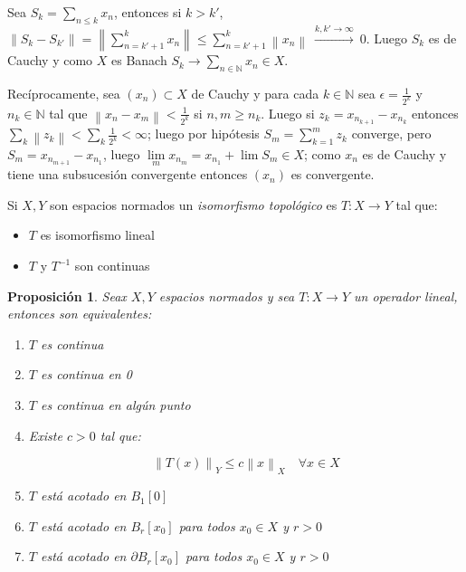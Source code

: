 \documentclass[11pt]{article}
\newcommand{\N}{{\mathbb{N}}}
\newcommand{\norm}[1]{\left\lVert#1\right\rVert}
\newcommand{\Bigsum}[2]{\sum\limits_{#1}{#2}}
\numberwithin{theorem}{subsection}
\newtheorem{proposition}[theorem]{Proposici\'on}
\newenvironment{proof}[1][Demostraci\'on]{\begin{trivlist}
		\item[\hskip \labelsep {\bfseries #1}]}{\end{trivlist}}
\newenvironment{definition}[1][Definici\'on]{\begin{trivlist}
		\item[\hskip \labelsep {\bfseries #1}]}{\end{trivlist}}
\newcommand{\qed}{\nobreak \ifvmode \relax \else
	\ifdim\lastskip<1.5em \hskip-\lastskip
	\hskip1.5em plus0em minus0.5em \fi \nobreak
	\vrule height0.75em width0.5em depth0.25em\fi}
\begin{document}
\begin{proof}
	Sea $S_k = \Bigsum{n \leq k}{x_n}$, entonces si $k > k'$, $\norm{S_{k} - S_{k'}} = \norm{\sum\limits_{n = k'+1}^{k}{x_n}} \leq \sum\limits_{n = k'+1}^{k}{\norm{x_n}} \ \xrightarrow{k,k' \rightarrow \infty} \ 0$. Luego $S_k$ es de Cauchy y como $X$ es Banach $S_k \rightarrow \Bigsum{n \in \N}{x_n} \in X$.
	
	Rec\'iprocamente, sea $\left(x_n\right) \subset X$ de Cauchy y para cada $k \in \N$ sea $\epsilon = \frac{1}{2^k}$ y $n_k \in \N$ tal que $\norm{x_{n} - x_m} < \frac{1}{2^k}$ si $n,m \geq n_k$. Luego si $z_k = x_{n_{k+1}} - x_{n_k}$ entonces $\Bigsum{k}{\norm{z_k}} < \Bigsum{k}{\frac{1}{2^k}} < \infty$; luego por hip\'otesis $S_m = \sum\limits_{k=1}^{m}{z_k}$ converge, pero $S_m = x_{n_{m+1}} - x_{n_1}$, luego $\lim\limits_{m} {x_{n_m}} = x_{n_1} + \lim S_m \in X$; como $x_n$ es de Cauchy y tiene una subsucesi\'on convergente entonces $(x_n)$ es convergente. \qed
	
\end{proof}

\begin{definition}
	Si $X,Y$ son espacios normados un \textit{isomorfismo topol\'ogico} es $T : X \rightarrow Y$ tal que:
	
	\begin{itemize}
		\item $T$ es isomorfismo lineal
		\item $T$ y $T^{-1}$ son continuas
	\end{itemize}
	
\end{definition}

\begin{proposition}
	\label{Continuidad de un operador}
	Seax $X,Y$ espacios normados y sea $T : X \rightarrow Y$ un operador lineal, entonces son equivalentes:
	
	\begin{enumerate}
		\item $T$ es continua
		\item $T$ es continua en 0
		\item $T$ es continua en alg\'un punto
		\item Existe $c > 0$ tal que:
		
		\begin{equation}
		\label{eq: Operador acotado}
		\norm{T(x)}_Y \leq c \norm{x}_X \quad \forall x \in X
		\end{equation}
		\item $T$ est\'a acotado en $B_1[0]$
		\item $T$ est\'a acotado en $B_r[x_0]$ para todos $x_0 \in X$ y $r > 0$
		\item $T$ est\'a acotado en $\partial B_r[x_0]$ para todos $x_0 \in X$ y $r > 0$
	\end{enumerate}
\end{proposition}
\end{document}
